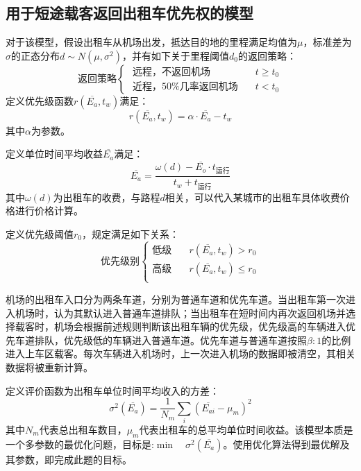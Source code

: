 \documentclass{cumcm}
\begin{document}
\subsection{用于短途载客返回出租车优先权的模型}
对于该模型，假设出租车从机场出发，抵达目的地的里程满足均值为$\mu$，标准差为$\sigma$的正态分布$d\sim N(\mu,\sigma^2)$，并有如下关于里程阈值$d_0$的返回策略：
\begin{equation}
	\mbox{返回策略}
	\begin{cases}
		\mbox{  远程，不返回机场}\quad & t\ge t_0 \\
		\mbox{  近程，50\%几率返回机场}\quad & t<t_0
	\end{cases}
\end{equation}
定义优先级函数$r(\overline{E_a},t_w)$满足：
\begin{equation}
	r(\overline{E_a},t_w)=\alpha\cdot\overline{E_a}-t_w
	\label{eq:r}
\end{equation}
其中$\alpha$为参数。
\par
定义单位时间平均收益$\overline{E_a}$满足：
\begin{equation}
	\overline{E_a}=\frac{\omega(d)-\overline{E_o}\cdot t_{\mbox{运行}}}{t_w+t_{\mbox{运行}}}
	\label{eq:ea}
\end{equation}
其中$\omega(d)$为出租车的收费，与路程$d$相关，可以代入某城市的出租车具体收费价格进行价格计算。\par
定义优先级阈值$r_0$，规定满足如下关系：
\begin{equation}
	\mbox{优先级别}
	\begin{cases}
		\mbox{低级}\quad & r(\overline{E_a},t_w)>r_0 \\
		\mbox{高级}\quad & r(\overline{E_a},t_w)\le r_0 \\
	\end{cases}
\end{equation}
\par
机场的出租车入口分为两条车道，分别为普通车道和优先车道。当出租车第一次进入机场时，认为其默认进入普通车道排队；当出租车在短时间内再次返回机场并选择载客时，机场会根据前述规则判断该出租车辆的优先级，优先级高的车辆进入优先车道排队，优先级低的车辆进入普通车道。优先车道与普通车道按照$\beta:1$的比例进入上车区载客。每次车辆进入机场时，上一次进入机场的数据即被清空，其相关数据将被重新计算。\par
定义评价函数为出租车单位时间平均收入的方差：
\begin{equation}
	\sigma^2(\overline{E_a})=\frac{1}{N_m}\sum_i(\overline{E_{ai}}-\mu_m)^2
\end{equation}
其中$N_m$代表总出租车数目，$\mu_m$代表出租车的总平均单位时间收益。该模型本质是一个多参数的最优化问题，目标是:$\min\quad\sigma^2(\overline{E_a})$。使用优化算法得到最优解及其参数，即完成此题的目标。
\end{document}
